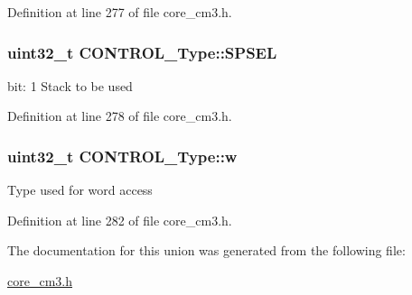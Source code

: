 Definition at line 277 of file core\+\_\+cm3.\+h.

\subsubsection[{\texorpdfstring{S\+P\+S\+EL}{SPSEL}}]{\setlength{\rightskip}{0pt plus 5cm}uint32\+\_\+t C\+O\+N\+T\+R\+O\+L\+\_\+\+Type\+::\+S\+P\+S\+EL}\hypertarget{unionCONTROL__Type_a8cc085fea1c50a8bd9adea63931ee8e2}{}\label{unionCONTROL__Type_a8cc085fea1c50a8bd9adea63931ee8e2}
bit\+: 1 Stack to be used 

Definition at line 278 of file core\+\_\+cm3.\+h.

\subsubsection[{\texorpdfstring{w}{w}}]{\setlength{\rightskip}{0pt plus 5cm}uint32\+\_\+t C\+O\+N\+T\+R\+O\+L\+\_\+\+Type\+::w}\hypertarget{unionCONTROL__Type_a6b642cca3d96da660b1198c133ca2a1f}{}\label{unionCONTROL__Type_a6b642cca3d96da660b1198c133ca2a1f}
Type used for word access 

Definition at line 282 of file core\+\_\+cm3.\+h.



The documentation for this union was generated from the following file\+:\begin{DoxyCompactItemize}
\item 
\hyperlink{core__cm3_8h}{core\+\_\+cm3.\+h}\end{DoxyCompactItemize}

